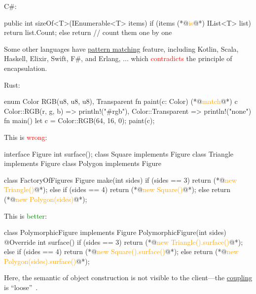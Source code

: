\documentclass{article}
\begin{document}
\begin{pptWide}{2}
C\#:\par
{\scriptsize\begin{ffcode}
public int sizeOf<T>(IEnumerable<T> items) {
  if (items (*@\textcolor{orange}{is}@*) IList<T> list) {
    return list.Count;
  } else {
    return // count them one by one
  }
}
\end{ffcode}
}
\par
Some other languages have \ul{pattern matching} feature,
including Kotlin, Scala, Haskell, Elixir, Swift, F\#, and Erlang, ...
which \textcolor{red}{contradicts} the principle of encapsulation.
\par\columnbreak\par
Rust:
\par
{\scriptsize\begin{ffcode}
enum Color {
  RGB(u8, u8, u8),
  Transparent
}
fn paint(c: Color) {
  (*@\textcolor{orange}{match}@*) c {
    Color::RGB(r, g, b) =>
      println!("#{r}{g}{b}"),
    Color::Transparent =>
      println!("none")
  }
}
fn main() {
  let c = Color::RGB(64, 16, 0);
  paint(c);
}
\end{ffcode}
}
\end{pptWide}
\par
\plush{}


\begin{pptWide}{2}
This is \textcolor{red}{wrong}:
\par
{\scriptsize\begin{ffcode}
interface Figure
  int surface();
class Square implements Figure
class Triangle implements Figure
class Polygon implements Figure

class FactoryOfFigures
  Figure make(int sides) {
    if (sides == 3) {
      return (*@\textcolor{orange}{new Triangle()}@*);
    } else if (sides == 4) {
      return (*@\textcolor{orange}{new Square()}@*);
    } else {
      return (*@\textcolor{orange}{new Polygon(sides)}@*);
    }
  }
\end{ffcode}
}
\par\columnbreak\par
This is \textcolor{green}{better}:
\par
{\scriptsize\begin{ffcode}
class PolymorphicFigure implements Figure
  PolymorphicFigure(int sides)
  @Override int surface() {
    if (sides == 3) {
      return (*@\textcolor{orange}{new Triangle().surface()}@*);
    } else if (sides == 4) {
      return (*@\textcolor{orange}{new Square().surface()}@*);
    } else {
      return (*@\textcolor{orange}{new Polygon(sides).surface()}@*);
    }
  }
\end{ffcode}
}
\par
Here, the semantic of object construction is not visible to
the client---the \ul{coupling} is ``loose''~\citep{bugayenko2022blog0605}.
\end{pptWide}
\plush{}
\end{document}
